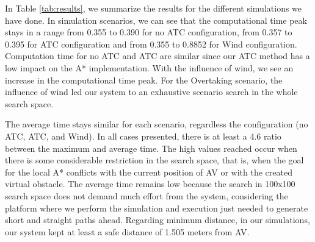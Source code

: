         In Table \ref{tab:results}, we summarize the results for the different simulations we have done. In simulation scenarios, we can see that the computational time peak stays in a range from 0.355 to 0.390 for no \ac{ATC} configuration, from 0.357 to 0.395 for \ac{ATC} configuration and from 0.355 to 0.8852 for Wind configuration. Computation time for no \ac{ATC} and \ac{ATC} are similar since our \ac{ATC} method has a low impact on the A* implementation. With the influence of wind, we see an increase in the computational time peak. For the Overtaking scenario, the influence of wind led our system to an exhaustive scenario search in the whole search space. 
        
        The average time stays similar for each scenario, regardless the configuration (no \ac{ATC}, \ac{ATC}, and Wind). In all cases presented, there is at least a 4.6 ratio between the maximum and average time. The high values reached occur when there is some considerable restriction in the search space, that is, when the goal for the local A* conflicts with the current position of \ac{AV} or with the created virtual obstacle. The average time remains low because the search in 100x100 search space does not demand much effort from the system, considering the platform where we perform the simulation and execution just needed to generate short and straight paths ahead. Regarding minimum distance, in our simulations, our system kept at least a safe distance of 1.505 meters from \ac{AV}. 
        
        

